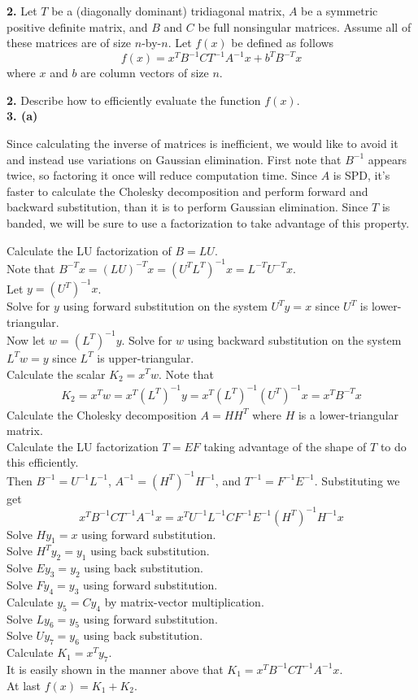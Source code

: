 \documentclass[12pt]{article}
\newcommand{\problem}[1]{\hspace{-4 ex} \large \textbf{#1}}
\begin{document}
\problem{2.} Let $T$ be a (diagonally dominant) tridiagonal matrix, $A$ be a symmetric positive definite matrix, and $B$ and $C$ be full nonsingular matrices. Assume all of these matrices are of size $n$-by-$n$. Let $f(x)$ be defined as follows $$f(x) = x^TB^{-1}CT^{-1}A^{-1}x + b^TB^{-T}x$$ where $x$ and $b$ are column vectors of size $n$.

\problem{2.} Describe how to efficiently evaluate the function $f(x)$. \\
	
	
\problem{3. (a)}

	Since calculating the inverse of matrices is inefficient, we would like to avoid it and instead use variations on Gaussian elimination. First note that $B^{-1}$ appears twice, so factoring it once will reduce computation time. Since $A$ is SPD, it's faster to calculate the Cholesky decomposition and perform forward and backward substitution, than it is to perform Gaussian elimination. Since $T$ is banded, we will be sure to use a factorization to take advantage of this property. \bigbreak
	
	Calculate the LU factorization of $B = LU$. \\
	Note that $B^{-T}x = (LU)^{-T}x = (U^TL^T)^{-1}x = L^{-T}U^{-T}x$. \\
	Let $y = (U^T)^{-1}x$. \\
	Solve for $y$ using forward substitution on the system $U^Ty=x$ since $U^T$ is lower-triangular. \\
	Now let $w = (L^T)^{-1}y$. Solve for $w$ using backward substitution on the system $L^Tw=y$ since $L^T$ is upper-triangular. \\
	Calculate the scalar $K_2 = x^Tw$. Note that
	\begin{align*}
		K_2 = x^Tw = x^T(L^T)^{-1}y = x^T(L^T)^{-1}(U^T)^{-1}x = x^TB^{-T}x
	\end{align*}
	Calculate the Cholesky decomposition $A = HH^T$ where $H$ is a lower-triangular matrix. \\
	Calculate the LU factorization $T = EF$ taking advantage of the shape of $T$ to do this efficiently. \\
	Then $B^{-1} = U^{-1}L^{-1}$, $A^{-1}=(H^T)^{-1}H^{-1}$, and $T^{-1} = F^{-1}E^{-1}$. Substituting we get
	$$
	x^TB^{-1}CT^{-1}A^{-1}x = x^TU^{-1}L^{-1}CF^{-1}E^{-1}(H^T)^{-1}H^{-1}x
	$$
	Solve $Hy_1=x$ using forward substitution.\\
	Solve $H^Ty_2 = y_1$ using back substitution.\\
	Solve $E y_3 = y_2$ using back substitution. \\
	Solve $F y_4 = y_3$ using forward substitution. \\
	Calculate $y_5 = Cy_4$ by matrix-vector multiplication. \\
	Solve $L y_6 = y_5$ using forward substitution. \\
	Solve $U y_7 = y_6$ using back substitution. \\
	Calculate $K_1 = x^Ty_7$. \\
	It is easily shown in the manner above that $K_1 = x^TB^{-1}CT^{-1}A^{-1}x$.\\
	At last $f(x) = K_1 + K_2$.\\
\end{document}
